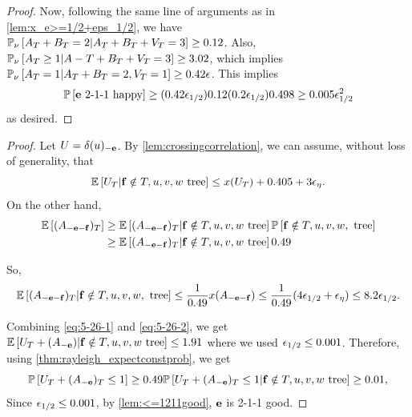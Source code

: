 \begin{proof}
Now, following the same line of arguments as in \cref{lem:x_e>=1/2+eps_1/2}, we have \\${\mathbb{P}}_{\nu}\left[A_T+B_T=2 | A_T+B_T+V_T=3\right] \geq 0.12$.
Also, ${\mathbb{P}}_{\nu}\left[A_T\geq 1 | A-T+B_T+V_T=3\right] \geq 3.02$, which implies ${\mathbb{P}}_{\nu}\left[A_T=1 | A_T+B_T=2,V_T=1\right] \geq 0.42{\epsilon}$. This implies
$$
	{\mathbb{P}}\left[{\bf e} \text{ 2-1-1 happy}\right] \geq (0.42{\epsilon}_{1/2})0.12(0.2{\epsilon}_{1/2})0.498\geq 0.005{\epsilon}_{1/2}^2
$$
as desired.
\end{proof}


\lemoneoftwotwooneone*
\begin{proof}
Let $U=\delta(u)_{-{\bf e}}$.
By \cref{lem:crossingcorrelation}, we can assume, without loss of generality, that
\begin{equation}
\label{eq:5-26-1}
	 {\mathbb{E}}\left[U_T | {\bf f}\notin T,u,v,w\text{ tree}\right]\leq x(U_T)+0.405 +3{\epsilon}_{\eta}.
\end{equation}
On the other hand,  
\begin{align*} {\mathbb{E}}\left[(A_{-{\bf e}-{\bf f}})_T\right] &\geq {\mathbb{E}}\left[(A_{-{\bf e}-{\bf f}})_T|{\bf f}\notin T, u,v,w\text{ tree}\right] {\mathbb{P}}\left[{\bf f}\notin T, u,v,w,\text{ tree}\right]\\
&	\geq {\mathbb{E}}\left[(A_{-{\bf e}-{\bf f}})_T|{\bf f}\notin T, u,v,w\text{ tree}\right] 0.49
\end{align*}

So, 
\begin{equation}
\label{eq:5-26-2} 	
{\mathbb{E}}\left[(A_{-{\bf e}-{\bf f}})_T | {\bf f}\notin T, u,v,w,\text{ tree}\right] \leq \frac{1}{0.49} x(A_{-{\bf e}-{\bf f}}) \leq \frac{1}{0.49} (4{\epsilon}_{1/2}+{\epsilon}_{\eta}) \leq 8.2{\epsilon}_{1/2}.
\end{equation}


Combining \eqref{eq:5-26-1} and \eqref{eq:5-26-2}, we get
${\mathbb{E}}\left[U_T+(A_{-{\bf e}}) | {\bf f}\notin T,u,v,w \text{ tree}\right]\leq 1.91$ where we used ${\epsilon}_{1/2}\leq 0.001$.
Therefore, using \cref{thm:rayleigh_expectconstprob}, we get
$${\mathbb{P}}\left[U_T + (A_{-{\bf e}})_T\leq 1\right] \geq 0.49 {\mathbb{P}}\left[U_T + (A_{-{\bf e}})_T\leq 1 | {\bf f}\notin T,u,v,w\text{ tree}\right]\geq 0.01,$$
Since ${\epsilon}_{1/2}\leq 0.001$, by \cref{lem:<=1211good}, ${\bf e}$ is 2-1-1 good.
\end{proof}




